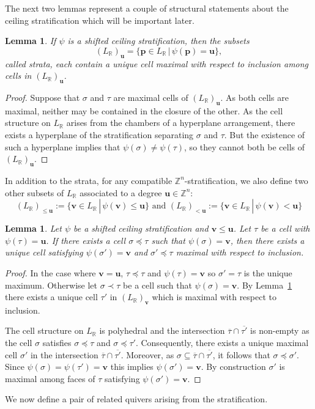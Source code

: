 \documentclass{amsart}
\newcommand{\ZZ}{\mathbb{Z}}
\newcommand{\RR}{\mathbb{R}}
\newtheorem{lemma}[theorem]{Lemma}
\theoremstyle{remark}
\begin{document}
The next two lemmas represent a couple of structural statements about the ceiling stratification which will be important later.
\begin{lemma}
  \label{lem:strata-maximal-cells}
  If $\psi$ is a shifted ceiling stratification, then the subsets
  \[(L_{\RR})_{\bm{u}}=\{\bm{p}\in L_{\RR} \,|\, \psi(\bm{p}) = \bm{u}\},\]
  called \emph{strata}, each contain a unique cell maximal with respect to inclusion among cells in $(L_{\RR})_{\bm{u}}$.
\end{lemma}
\begin{proof}
  Suppose that $\sigma$ and $\tau$ are maximal cells of $(L_{\RR})_{\bm{u}}$. As both cells are maximal, neither may be contained in the closure of the other.
  As the cell structure on $L_{\RR}$ arises from the chambers of a hyperplane arrangement, there exists a hyperplane of the stratification separating $\sigma$ and $\tau$.
  But the existence of such a hyperplane implies that $\psi(\sigma)\neq \psi(\tau)$, so they cannot both be cells of $(L_{\RR})_{\bm{u}}$.
\end{proof}

In addition to the strata, for any compatible $\ZZ^n$-stratification, we also define two other subsets of $L_{\RR}$ associated to a degree $\bm{u}\in \ZZ^n$:
\[(L_{\RR})_{\leq \bm{u}}:=\{\bm{v}\in L_{\RR} \,|\, \psi(\bm{v})\leq \bm{u}\}
\text{ and }
(L_{\RR})_{< \bm{u}}:=\{\bm{v}\in L_{\RR} \,|\, \psi(\bm{v})< \bm{u}\}\]

\begin{lemma}
  \label{lem:unique-maximal-cell}
  Let $\psi$ be a shifted ceiling stratification and $\bm{v}\leq \bm{u}$. Let $\tau$ be a cell with $\psi(\tau)=\bm{u}$.
  If there exists a cell $\sigma\preceq \tau$ such that $\psi(\sigma)=\bm{v}$, then there exists a unique cell satisfying $\psi(\sigma')=\bm{v}$ and $\sigma'\preceq \tau$ maximal with respect to inclusion.
\end{lemma}
\begin{proof}
  In the case where $\bm{v}=\bm{u}$, $\tau\preceq\tau$ and $\psi(\tau)=\bm{v}$ so $\sigma'=\tau$ is the unique maximum.
  Otherwise let $\sigma\prec \tau$ be a cell such that $\psi(\sigma)=\bm{v}$.
  By Lemma~\ref{lem:strata-maximal-cells} there exists a unique cell $\tau'$ in $(L_{\RR})_{\bm{v}}$ which is maximal with respect to inclusion.

  The cell structure on $L_{\RR}$ is polyhedral and the intersection $\overline{\tau}\cap \overline{\tau'}$
  is non-empty as the cell $\sigma$ satisfies $\sigma\preceq \tau$ and $\sigma\preceq \tau'$.
  Consequently, there exists a unique maximal cell $\sigma'$ in the intersection $\overline{\tau}\cap \overline{\tau'}$.
  Moreover, as $\sigma\subseteq \overline{\tau}\cap\overline{\tau'}$, it follows that $\sigma\preceq \sigma'$.
  Since $\psi(\sigma)=\psi(\tau')=\bm{v}$ this implies $\psi(\sigma')=\bm{v}$.
  By construction $\sigma'$ is maximal among faces of $\tau$ satisfying $\psi(\sigma')=\bm{v}$.
\end{proof}
We now define a pair of related quivers arising from the stratification.
\end{document}
